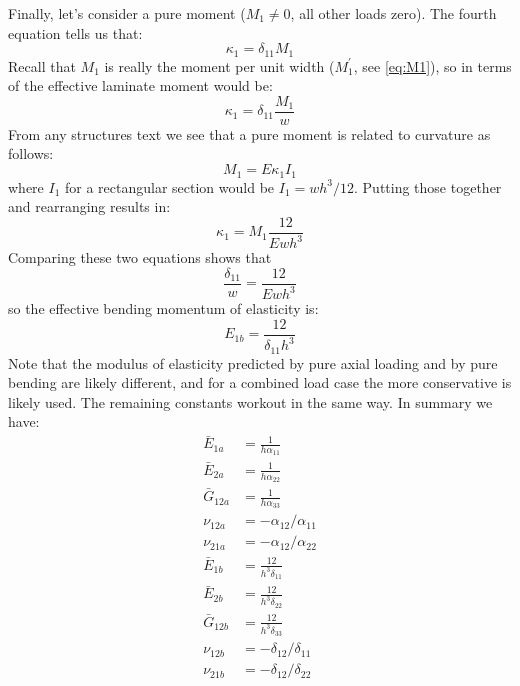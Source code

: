 \documentclass{article}
\begin{document}
Finally, let's consider a pure moment ($M_1 \ne 0$, all other loads zero).  The fourth equation tells us that:
\begin{equation}
\kappa_1 = \delta_{11} M_1
\end{equation}
Recall that $M_1$ is really the moment per unit width ($M_1^\prime$, see \cref{eq:M1}), so in terms of the effective laminate moment would be:
\begin{equation}
\kappa_1 = \delta_{11} \frac{M_1}{w}
\end{equation}
From any structures text we see that a pure moment is related to curvature as follows:
\begin{equation}
M_1 = E \kappa_1 I_1
\end{equation}
where $I_1$ for a rectangular section would be $I_1 = w h^3/12$.  Putting those together and rearranging results in:
\begin{equation}
\kappa_1 = M_1 \frac{12}{E w h^3}
\end{equation}
Comparing these two equations shows that
\begin{equation}
     \frac{\delta_{11}}{w} = \frac{12}{E w h^3}
\end{equation}
so the effective bending momentum of elasticity is:
\begin{equation}
E_{1b} = \frac{12}{\delta_{11} h^3}
\end{equation}
Note that the modulus of elasticity predicted by pure axial loading and by pure bending are likely different, and for a combined load case the more conservative is likely used.  The remaining constants workout in the same way.  In summary we have:
\begin{align}
    \bar E_{1a} &= \frac{1}{h \alpha_{11}}\\
    \bar E_{2a} &= \frac{1}{h \alpha_{22}}\\
    \bar G_{12a} &= \frac{1}{h \alpha_{33}}\\
    \nu_{12a} &= -\alpha_{12}/\alpha_{11}\\
    \nu_{21a} &= -\alpha_{12}/\alpha_{22}\\
    \bar E_{1b} &= \frac{12}{h^3 \delta_{11}}\\
    \bar E_{2b} &= \frac{12}{h^3 \delta_{22}}\\
    \bar G_{12b} &= \frac{12}{h^3 \delta_{33}}\\
    \nu_{12b} &= -\delta_{12}/\delta_{11}\\
    \nu_{21b} &= -\delta_{12}/\delta_{22}
\end{align}
\end{document}
